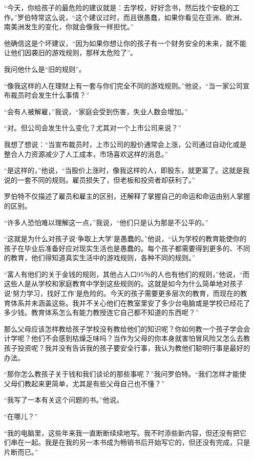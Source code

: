 “今天，你给孩子的最危险的建议就是：去学校，好好念书，然后找个安稳的工作。”罗伯特常这么说，“这个建议过时，而且很愚蠢，如果你看见在亚洲、欧洲、南美洲发生的变化，你就会像我一样担忧。”

他确信这是个坏建议，“因为如果你想让你的孩子有一个财务安全的未来，就不能让他们因袭旧的游戏规则，那样太危险了”。

我问他什么是“旧的规则”。

“像我这样的人在理财上有一套与你们完全不同的游戏规则。”他说，“当一家公司宣布裁员时会发生什么事情？”

“会有人被解雇，”我说，“家庭会受到伤害，失业人数会增加。”

“对。但公司会发生什么变化？尤其对一个上市公司来说？”

我想了想说：“当宣布裁员时，上市公司的股价通常会上涨，公司通过自动化或是整合人力资源减少了人工成本，市场喜欢这样的消息。”

“是这样的，”他说，“当股价上涨时，像我这样的人，即股东，就更富了。这就是我说的一套不同的规则。雇员损失了，但老板和投资者却获利了。”

罗伯特不仅描述了雇员和雇主的区别，还解释了掌握自己的命运和命运由别人掌握的区别。

“许多人恐怕难以理解这一点，”我说，“他们只是认为那是不公平的。”

“这就是为什么对孩子说‘争取上大学’是愚蠢的。”他说，“认为学校的教育能使你的孩子在毕业后准备好应对现实生活也是愚蠢的。每个孩子都需要得到更多的、不同的教育，他们得知道真实生活中的游戏规则，各种不同的规则。”

“富人有他们的关于金钱的规则，其他占人口95％的人也有他们的规则，”他说，“而这些人是从学校和家庭教育中学到这些规则的。这就是如今为什么简单地对孩子说‘努力学习，找好工作’是危险的。今天的孩子需要更多层次的教育，而现在的教育体系并未涵盖这些。我并不关心他们在教室里安了多少台电脑或是学校已经花了多少钱。教育体系怎么有能力教授连它自己都不知道的东西呢？”

那么父母应该怎样教给孩子学校没有教给他们的知识呢？你如何教一个孩子学会会计学呢？他们不会感到枯燥乏味吗？当作为父母的你本身就害怕冒风险又怎么去教孩子投资呢？我并没有告诉我的孩子要安全行事，我认为教他们聪明行事是最好的办法。

“那你怎么教孩子关于钱和我们谈论的那些事呢？”我问罗伯特。“我们怎样才能使父母们教起来更简单，尤其是有些父母自己也不懂？”

“我写了一本有关这个问题的书。”他说。

“在哪儿？”

“我的电脑里，这些年来我一直断断续续地写。我不时添些新内容，但还没有把它们串在一起。我是在我的另一本书成为畅销书后开始写它的，但还没有完成，只是片断而已。”

